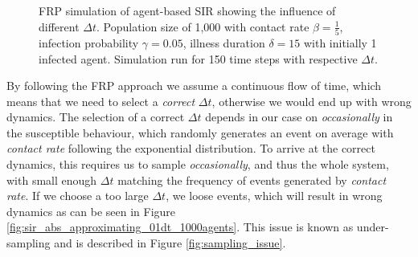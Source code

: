 \begin{figure}
\begin{center}
	\caption{FRP simulation of agent-based SIR showing the influence of different $\Delta t$. Population size of 1,000 with contact rate $\beta = \frac{1}{5}$, infection probability $\gamma = 0.05$, illness duration $\delta = 15$ with initially 1 infected agent. Simulation run for 150 time steps with respective $\Delta t$.} 
	\label{fig:sir_abs_dynamics_frp}
\end{center}
\end{figure}

By following the FRP approach we assume a continuous flow of time, which means that we need to select a \textit{correct} $\Delta t$, otherwise we would end up with wrong dynamics. The selection of a correct $\Delta t$ depends in our case on \textit{occasionally} in the susceptible behaviour, which randomly generates an event on average with \textit{contact rate} following the exponential distribution. To arrive at the correct dynamics, this requires us to sample \textit{occasionally}, and thus the whole system, with small enough $\Delta t$ matching the frequency of events generated by \textit{contact rate}. If we choose a too large $\Delta t$, we loose events, which will result in wrong dynamics as can be seen in Figure \ref{fig:sir_abs_approximating_01dt_1000agents}. This issue is known as under-sampling and is described in Figure \ref{fig:sampling_issue}.

